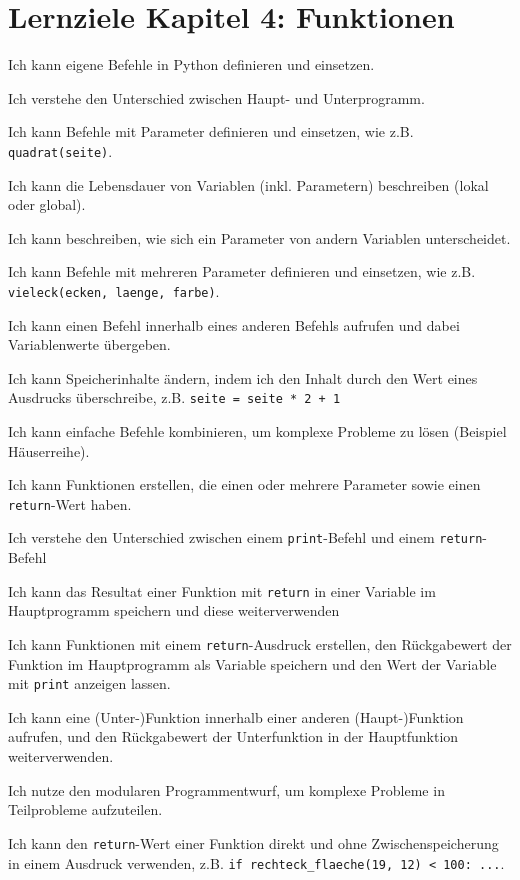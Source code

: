 \section{Lernziele Kapitel 4: Funktionen}
\begin{todolist}
    \item Ich kann eigene Befehle in Python definieren und einsetzen.
    \item Ich verstehe den Unterschied zwischen Haupt- und Unterprogramm.
    \item Ich kann Befehle mit Parameter definieren und einsetzen, wie z.B. \lstinline|quadrat(seite)|.
    \item Ich kann die Lebensdauer von Variablen (inkl. Parametern) beschreiben (lokal oder global).
    \item Ich kann beschreiben, wie sich ein Parameter von andern Variablen unterscheidet.
    \item Ich kann Befehle mit mehreren Parameter definieren und einsetzen, wie z.B. \lstinline|vieleck(ecken, laenge, farbe)|.
    \item Ich kann einen Befehl innerhalb eines anderen Befehls aufrufen und dabei Variablenwerte übergeben.
    \item Ich kann Speicherinhalte ändern, indem ich den Inhalt durch den Wert eines Ausdrucks überschreibe, z.B. \lstinline|seite = seite * 2 + 1|
    \item Ich kann einfache Befehle kombinieren, um komplexe Probleme zu lösen (Beispiel Häuserreihe).
    \item Ich kann Funktionen erstellen, die einen oder mehrere Parameter sowie einen \lstinline|return|-Wert haben.
    \item Ich verstehe den Unterschied zwischen einem \lstinline|print|-Befehl und einem \lstinline|return|-Befehl
    \item Ich kann das Resultat einer Funktion mit \lstinline|return| in einer Variable im Hauptprogramm speichern und diese weiterverwenden
    \item Ich kann Funktionen mit einem \lstinline|return|-Ausdruck erstellen, den Rückgabewert der Funktion im Hauptprogramm als Variable speichern und den Wert der Variable mit \lstinline|print| anzeigen lassen.
    \item Ich kann eine (Unter-)Funktion innerhalb einer anderen (Haupt-)Funktion aufrufen, und den Rückgabewert der Unterfunktion in der Hauptfunktion weiterverwenden.
    \item Ich nutze den modularen Programmentwurf, um komplexe Probleme in Teilprobleme aufzuteilen.
    \item Ich kann den \lstinline|return|-Wert einer Funktion direkt und ohne Zwischenspeicherung in einem Ausdruck verwenden, z.B. \lstinline|if rechteck_flaeche(19, 12) < 100: ...|.
\end{todolist}

